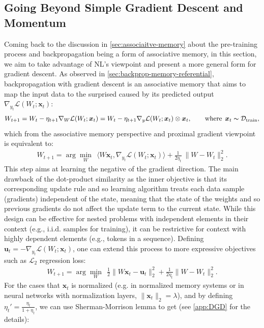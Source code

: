 \documentclass{article}
\newcommand{\inner}[2]{\langle #1, #2 \rangle}
\newcommand{\vx}{\boldsymbol{x}}
\begin{document}
{\vspace{2ex}
\subsection{Going Beyond Simple Gradient Descent and Momentum} \label{sec:L2-backprop}
Coming back to the discussion in \autoref{sec:associaitve-memory} about the pre-training process and backpropagation being a form of associative memory, in this section, we aim to take advantage of NL's viewpoint and present a more general form for gradient descent. As observed in \autoref{sec:backprop-memory-referential}, backpropagation with gradient descent is an associative memory that aims to map the input data to the surprised caused by its predicted output $\nabla_{y_t} \mathcal{L}(W_t;\boldsymbol{x}_t)$:
\begin{align}\label{eq:gradient-dual-2}
    W_{t+1} = W_{t} - \eta_{t+1} \nabla_{W} \mathcal{L}(W_t;\boldsymbol{x}_t) = W_{t} - \eta_{t+1} \nabla_{y} \mathcal{L}(W_t;\boldsymbol{x}_t) \otimes\boldsymbol{x}_t, \qquad \text{where}\:\:\boldsymbol{x}_t \thicksim \mathcal{D}_{\text{train}},
\end{align}
which from the associative memory perspective and proximal gradient viewpoint is equivalent to: 
\begin{align}
    W_{t+1} = \arg\min_{W} \:\: \inner{W\boldsymbol{x}_t}{\nabla_{y_t} \mathcal{L}(W_t;\boldsymbol{x}_t)} + \frac{1}{2\eta_t} \: \|W - W_{t}\|^{2}_2.
\end{align}
This step aims at learning the negative of the gradient direction. The main drawback of the dot-product similarity as the inner objective is that its corresponding update rule and so learning algorithm treats each data sample (gradients) independent of the state, meaning that the state of the weights and so previous gradients do not affect the update term to the current state. While this design can be effective for nested problems with independent elements in their context (e.g., i.i.d. samples for training), it can be  restrictive for context with highly dependent elements (e.g., tokens in a sequence).  Defining $\mathbf{u}_t = -\nabla_{y_t} \mathcal{L}(W_t;\boldsymbol{x}_t)$, one can extend this process to more expressive objectives such as $\mathcal{L}_2$ regression loss:
\begin{align}
    W_{t+1} = \arg\min_{W} \:\: \frac{1}{2}\|W\boldsymbol{x}_t - \mathbf{u}_t \|^{2}_2 +  \frac{1}{2\eta_t}\|W - W_{t}\|^{2}_2.
\end{align}
For the cases that $\vx_t$ is normalized (e.g.  in normalized memory systems or in neural networks with normalization layers, $\|\vx_t\|_2 = \lambda$), and by defining $\eta_t' = \frac{\eta_t}{1+\eta_t}$, we can use Sherman-Morrison lemma to get (see \autoref{app:DGD} for the details):
}
\end{document}
